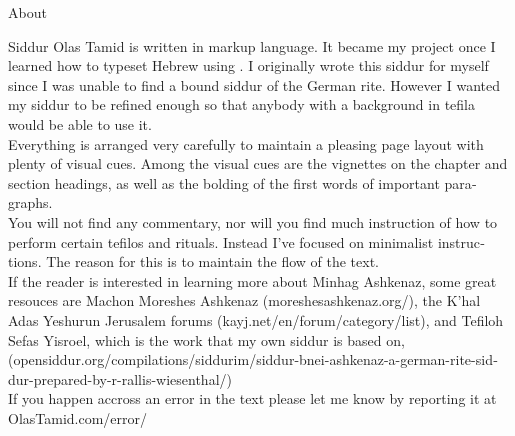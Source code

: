 \documentclass[twoside, openany, parskip=half, 11pt]{book}
\begin{document}
\begin{minipage}{\textwidth}

\begin{english}
\begin{center} %
\begin{LARGE}
About
\end{LARGE}
\end{center}

Siddur Olas Tamid is written in \XeLaTeX markup language. It became my project once I learned how to typeset Hebrew using \XeLaTeX. I originally wrote this siddur for myself since I was unable to find a bound siddur of the German rite. However I wanted my siddur to be refined enough so that anybody with a background in tefila would be able to use it. \\


Everything is arranged very carefully to maintain a pleasing page layout with plenty of visual cues. Among the visual cues are the vignettes on the chapter and section headings, as well as the bolding of the first words of important paragraphs. \\


You will not find any commentary, nor will you find much instruction of how to perform certain tefilos and rituals. Instead I've focused on minimalist instructions. The reason for this is to maintain the flow of the text. \\


If the reader is interested in learning more about Minhag Ashkenaz, some great resouces are Machon Moreshes Ashkenaz (moreshesashkenaz.org/), the K'hal Adas Yeshurun Jerusalem forums (kayj.net/en/forum/category/list), and Tefiloh Sefas Yisroel, which is the work that my own siddur is based on, (opensiddur.org/compilations/siddurim/siddur-bnei-ashkenaz-a-german-rite-siddur-prepared-by-r-rallis-wiesenthal/) \\

If you happen accross an error in the text please let me know by reporting it at OlasTamid.com/error/


\end{english}

\end{minipage}

\clearpage
\end{document}
